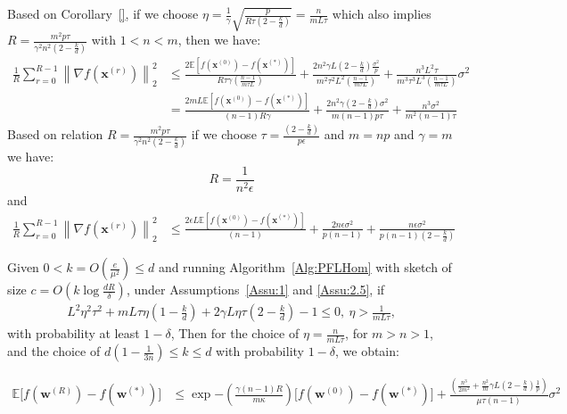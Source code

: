 \begin{corollary}
Based on Corollary~\ref{}, if we choose $\eta=\frac{1}{\gamma}\sqrt{\frac{p}{R\tau\left(2-\frac{k}{d}\right)}}=\frac{n}{mL\tau}$ which also  implies $R=\frac{m^2p\tau}{\gamma^2n^2\left(2-\frac{k}{d}\right)}$ with $1<n<m$, then we have:
\begin{align}
        \frac{1}{R}\sum_{r=0}^{R-1}\left\|\nabla f({\boldsymbol{x}}^{(r)})\right\|_2^2&\leq \frac{2 \mathbb{E}\left[f({\boldsymbol{x}}^{(0)})-f({\boldsymbol{x}}^{(*)})\right]}{R\tau \gamma \left(\frac{n-1}{m\tau L}\right)}+\frac{2n^2\gamma L\left(2-\frac{k}{d}\right)\frac{\sigma^2}{p}}{m^2\tau^2L^2 \left(\frac{n-1}{m\tau L}\right)}+\frac{n^3L^2\tau}{m^3\tau^3L^3\left(\frac{n-1}{m\tau L}\right)}\sigma^2\nonumber\\
        &=\frac{2mL \mathbb{E}\left[f({\boldsymbol{x}}^{(0)})-f({\boldsymbol{x}}^{(*)})\right]}{\left(n-1\right)R \gamma }+\frac{2n^2\gamma \left(2-\frac{k}{d}\right)\sigma^2}{m\left(n-1\right) p\tau  }+\frac{n^3\sigma^2}{m^2\left(n-1\right)\tau}
\end{align}
Based on relation $R=\frac{m^2p\tau}{\gamma^2n^2\left(2-\frac{k}{d}\right)}$ if we choose $\tau=\frac{\left(2-\frac{k}{d}\right)}{p\epsilon}$ and $m=np$ and $\gamma=m$ we have:
$$R=\frac{1}{n^2\epsilon}$$ and 
\begin{align}
     \frac{1}{R}\sum_{r=0}^{R-1}\left\|\nabla f({\boldsymbol{x}}^{(r)})\right\|_2^2&\leq \frac{2\epsilon L \mathbb{E}\left[f({\boldsymbol{x}}^{(0)})-f({\boldsymbol{x}}^{(*)})\right]}{\left(n-1\right)}+\frac{2n\epsilon \sigma^2}{p\left(n-1\right)}+\frac{n\epsilon\sigma^2}{p\left(n-1\right)\left(2-\frac{k}{d}\right)}
\end{align}
\end{corollary}

\begin{theorem}
Given $0<k=O\left(\frac{e}{\mu^2}\right)\leq d$
and running Algorithm~\ref{Alg:PFLHom} with sketch of size $c=O\left(k\log \frac{d R}{\delta}\right)$,  under Assumptions~\ref{Assu:1} and \ref{Assu:2.5}, if 
\begin{align}
       L^2\eta^2\tau^2+mL\tau\eta\left(1-\frac{k}{d}\right)+2\gamma L\eta\tau\left(2-\frac{k}{d}\right)-1\leq 0,\:\eta> \frac{1}{mL\tau},\label{eq:cnd-lrs-h-ii} 
\end{align}
with probability at least $1-\delta$, Then for the choice of $\eta=\frac{n}{mL\tau}$, for $m>n>1$, and the choice of $ d\left(1-\frac{1}{3n}\right)\leq k\leq d$ with probability $1-\delta$,  we obtain:


\begin{align}
                \mathbb{E}\Big[f({\boldsymbol{w}}^{(R)})-f({\boldsymbol{w}}^{(*)})\Big]&\leq\exp{-\left(\frac{\gamma\left(n-1\right) R}{m\kappa}\right) }\Big[f({\boldsymbol{w}}^{(0)})-f({\boldsymbol{w}}^{(*)})\Big]+\frac{\left(\frac{ n^3}{2m^2}+\frac{n^2}{m}\gamma L\left(2-\frac{k}{d}\right)\frac{1}{p} \right)}{\mu\tau\left(n-1\right)}\sigma^2
\end{align}

\end{theorem}

